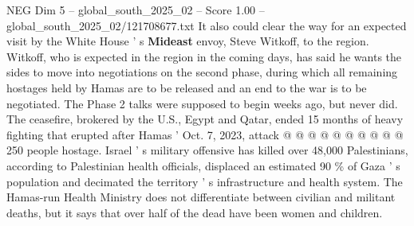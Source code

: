 \begin{textsample}{NEG Dim 5 – global\_south\_2025\_02 – Score 1.00 – global\_south\_2025\_02/121708677.txt}
It also could clear the way for an expected visit by the White House ' s \textbf{Mideast} envoy, Steve Witkoff, to the region.
Witkoff, who is expected in the region in the coming days, has said he wants the sides to move into negotiations on the second phase, during which all remaining hostages held by Hamas are to be released and an end to the war is to be negotiated.
The Phase 2 talks were supposed to begin weeks ago, but never did.
The ceasefire, brokered by the U.S., Egypt and Qatar, ended 15 months of heavy fighting that erupted after Hamas ' Oct. 7, 2023, attack @ @ @ @ @ @ @ @ @ @ 250 people hostage.
Israel ' s military offensive has killed over 48,000 Palestinians, according to Palestinian health officials, displaced an estimated 90 \% of Gaza ' s population and decimated the territory ' s infrastructure and health system.
The Hamas-run Health Ministry does not differentiate between civilian and militant deaths, but it says that over half of the dead have been women and children.

\end{textsample}
